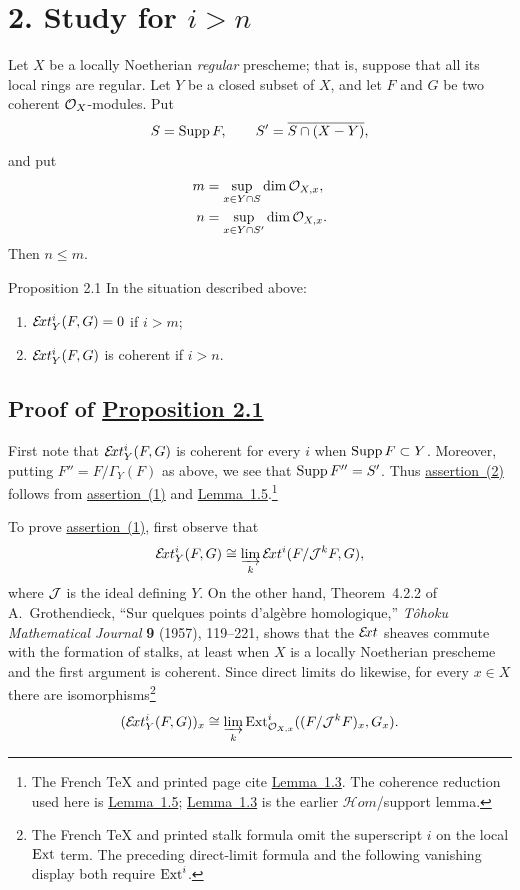 \section*{2. Study for $i>n$}

Let $X$ be a locally Noetherian \emph{regular} prescheme; that is, suppose that
all its local rings are regular. Let $Y$ be a closed subset of $X$, and let
$F$ and $G$ be two coherent $\mathcal O_X$-modules. Put
\[
  S=\operatorname{Supp} F,\qquad S'=\overline{S\cap(X-Y)},
\]
and put
\begin{align*}
  m&=\sup_{x\in Y\cap S}\dim\mathcal O_{X,x},\\
  n&=\sup_{x\in Y\cap S'}\dim\mathcal O_{X,x}.
\end{align*}
Then $n\leq m$.

\begin{sgastatement}{Proposition 2.1}
In the situation described above:
\begin{enumerate}
\item $\mathcal E\!xt_Y^i(F,G)=0$ if $i>m$;
\item $\mathcal E\!xt_Y^i(F,G)$ is coherent if $i>n$.
\end{enumerate}
\end{sgastatement}

\subsection*{Proof of \hyperref[VII.2.1]{Proposition 2.1}}

First note that $\mathcal E\!xt_Y^i(F,G)$ is coherent for every $i$ when
$\operatorname{Supp} F\subset Y$. Moreover, putting $F''=F/\Gamma_Y(F)$ as above, we see
that $\operatorname{Supp} F''=S'$. Thus \hyperref[VII.2.1]{assertion~(2)} follows from \hyperref[VII.2.1]{assertion~(1)} and
\hyperref[VII.1.5]{Lemma~1.5}.\footnote{The French TeX and printed page cite \hyperref[VII.1.3]{Lemma~1.3}. The
coherence reduction used here is \hyperref[VII.1.5]{Lemma~1.5}; \hyperref[VII.1.3]{Lemma~1.3} is the earlier
$\mathcal Hom$/support lemma.}

To prove \hyperref[VII.2.1]{assertion~(1)}, first observe that
\[
  \mathcal E\!xt_Y^i(F,G)\cong
  \varinjlim_k \mathcal E\!xt^i(F/\mathcal J^kF,G),
\]
where $\mathcal J$ is the ideal defining $Y$. On the other hand, Theorem~4.2.2 of
A.~Grothendieck, ``Sur quelques points d'alg\`ebre homologique,''
\emph{T\^ohoku Mathematical Journal} \textbf{9} (1957), 119--221, shows that
the $\mathcal E\!xt$ sheaves commute with the formation of stalks, at least when
$X$ is a locally Noetherian prescheme and the first argument is coherent.
Since direct limits do likewise, for every $x\in X$ there are
isomorphisms\footnote{The French TeX and printed stalk formula omit the
superscript $i$ on the local $\operatorname{Ext}$ term. The preceding direct-limit formula
and the following vanishing display both require $\operatorname{Ext}^i$.}
\[
  (\mathcal E\!xt_Y^i(F,G))_x\cong
  \varinjlim_k
  \operatorname{Ext}^i_{\mathcal O_{X,x}}((F/\mathcal J^kF)_x,G_x).
\]

